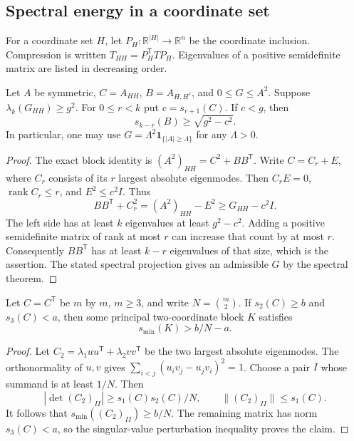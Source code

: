 \subsection{Spectral energy in a coordinate set}

For a coordinate set $H$, let $P_H:\mathbb R^{|H|}\to\mathbb R^n$
be the coordinate inclusion.  Compression is written
$T_{HH}=P_H^{\mathsf T}TP_H$.  Eigenvalues of a positive
semidefinite matrix are listed in decreasing order.

\begin{lemma}
\label{supp:spill}
Let $A$ be symmetric, $C=A_{HH}$, $B=A_{H,H^c}$, and
$0\le G\le A^2$.  Suppose $\lambda_k(G_{HH})\ge g^2$.
For $0\le r<k$ put $c=s_{r+1}(C)$.  If $c<g$, then
\[
 s_{k-r}(B)\ge\sqrt{g^2-c^2}.
\]
In particular, one may use $G=\Lambda^2
\mathbf1_{\{|A|\ge\Lambda\}}$ for any $\Lambda>0$.
\end{lemma}
\begin{proof}
The exact block identity is $(A^2)_{HH}=C^2+BB^{\mathsf T}$.
Write $C=C_r+E$, where $C_r$ consists of its $r$ largest
absolute eigenmodes.  Then $C_rE=0$, $\operatorname{rank}C_r\le r$,
and $E^2\le c^2I$.  Thus
\[
 BB^{\mathsf T}+C_r^2=(A^2)_{HH}-E^2\ge G_{HH}-c^2I.
\]
The left side has at least $k$ eigenvalues at least $g^2-c^2$.
Adding a positive semidefinite matrix of rank at most $r$ can
increase that count by at most $r$.  Consequently
$BB^{\mathsf T}$ has at least $k-r$ eigenvalues of that size,
which is the assertion.  The stated spectral projection gives an
admissible $G$ by the spectral theorem.
\end{proof}

\begin{lemma}
\label{supp:pair-extraction}
Let $C=C^{\mathsf T}$ be $m$ by $m$, $m\ge3$, and write
$N=\binom m2$.  If $s_2(C)\ge b$ and $s_3(C)<a$, then some
principal two-coordinate block $K$ satisfies
\[
 s_{\min}(K)>b/N-a.
\]
\end{lemma}
\begin{proof}
Let $C_2=\lambda_1uu^{\mathsf T}+\lambda_2vv^{\mathsf T}$ be the
two largest absolute eigenmodes.  The orthonormality of $u,v$ gives
$\sum_{i<j}(u_iv_j-u_jv_i)^2=1$.  Choose a pair $I$ whose
summand is at least $1/N$.  Then
\[
 |\det(C_2)_{II}|\ge s_1(C)s_2(C)/N,
 \qquad \|(C_2)_{II}\|\le s_1(C).
\]
It follows that $s_{\min}((C_2)_{II})\ge b/N$.
The remaining matrix has norm $s_3(C)<a$, so the singular-value
perturbation inequality proves the claim.
\end{proof}

